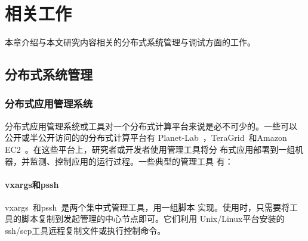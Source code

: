 \chapter{相关工作}
\label{chap:related}

本章介绍与本文研究内容相关的分布式系统管理与调试方面的工作。





\section{分布式系统管理}


% 
% 
% 
% 
% 
% 

\subsection{分布式应用管理系统}

分布式应用管理系统或工具对一个分布式计算平台来说是必不可少的。一些可以
公开或半公开访问的的分布式计算平台有
Planet-Lab~\cite{Bavier2004}，TeraGrid~\cite{Catlett2002}和Amazon
EC2~\cite{Garfinkel2007}。在这些平台上，研究者或开发者使用管理工具将分
布式应用部署到一组机器，并监测、控制应用的运行过程。一些典型的管理工具
有：


\subsubsection*{vxargs和pssh}

vxargs~\cite{vxargs}和pssh~\cite{pssh}是两个集中式管理工具，用一组脚本
实现。使用时，只需要将工具的脚本复制到发起管理的中心节点即可。它们利用
Unix/Linux平台安装的ssh/scp工具远程复制文件或执行控制命令。

